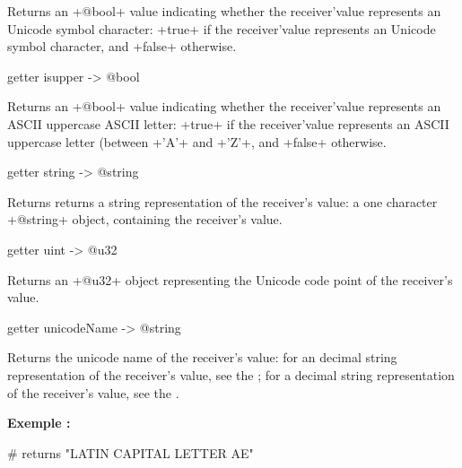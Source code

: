 Returns an \ggsq+@bool+ value indicating whether the receiver'value represents an Unicode symbol character: \ggsq+true+ if the receiver'value represents an Unicode symbol character, and \ggsq+false+ otherwise.










\begin{galgas4}
getter isupper -> @bool
\end{galgas4}

Returns an \ggsq+@bool+ value indicating whether the receiver'value represents an ASCII uppercase ASCII letter: \ggsq+true+ if the receiver'value represents an ASCII uppercase letter (between \ggsq+'A'+ and \ggsq+'Z'+, and \ggsq+false+ otherwise.






\begin{galgas4}
getter string -> @string
\end{galgas4}

Returns returns a string representation of the receiver's value: a one character \ggsq+@string+ object, containing the receiver's value.





\begin{galgas4}
getter uint -> @u32
\end{galgas4}

Returns an \ggsq+@u32+ object representing the Unicode code point of the receiver's value.





\begin{galgas4}
getter unicodeName -> @string
\end{galgas4}

Returns the unicode name of the receiver's value: for an decimal string representation of the receiver's value, see the ; for a decimal string representation of the receiver's value, see the .

\textbf{Exemple :}
\begin{galgas4}
['Æ' unicodeName] # returns "LATIN CAPITAL LETTER AE"
\end{galgas4}




